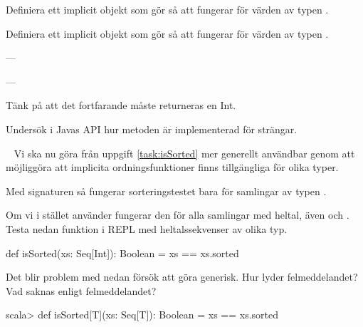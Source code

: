 \Subtask Definiera ett implicit objekt som gör så att  fungerar för värden av typen .

\Subtask Definiera ett implicit objekt som gör så att  fungerar för värden av typen .


\SOLUTION


\TaskSolved \what

\SubtaskSolved ---


\SubtaskSolved ---


\SubtaskSolved
Tänk på att det fortfarande måste returneras en Int.


\SubtaskSolved
Undersök i Javas API hur metoden  är implementerad för strängar.

\QUESTEND






\QUESTBEGIN

\Task \label{task:implicit-ordering} \what~  Vi ska nu göra  från uppgift \ref{task:isSorted} mer generellt användbar genom att möjliggöra att implicita ordningsfunktioner finns tillgängliga för olika typer.

\Subtask  Med signaturen   så
fungerar sorteringstestet bara för samlingar av typen .

Om vi i stället använder
 fungerar den för alla samlingar med heltal, även  och . Testa nedan funktion i REPL med heltalssekvenser av olika typ.
\begin{Code}
def isSorted(xs: Seq[Int]): Boolean = xs == xs.sorted
\end{Code}

\Subtask Det blir problem med nedan försök att göra  generisk. Hur lyder felmeddelandet? Vad saknas enligt felmeddelandet?
\begin{REPLnonum}
scala> def isSorted[T](xs: Seq[T]): Boolean = xs == xs.sorted
\end{REPLnonum}


